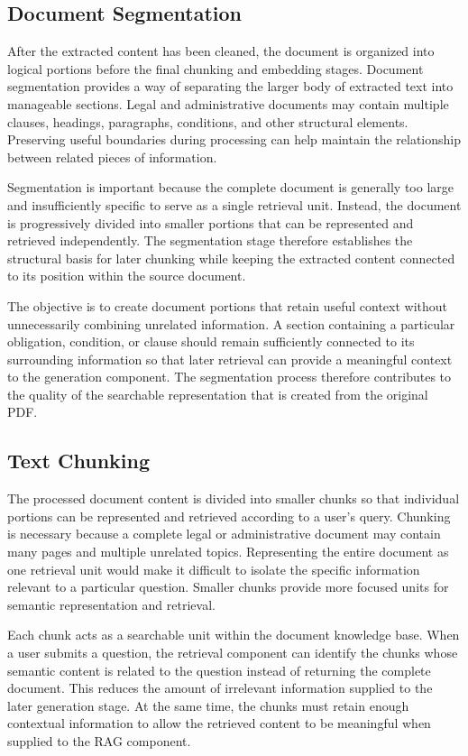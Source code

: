 \documentclass[12pt,a4paper,oneside]{report}
\begin{document}
\subsection{Document Segmentation}

After the extracted content has been cleaned, the document is organized into
logical portions before the final chunking and embedding stages. Document
segmentation provides a way of separating the larger body of extracted text
into manageable sections. Legal and administrative documents may contain
multiple clauses, headings, paragraphs, conditions, and other structural
elements. Preserving useful boundaries during processing can help maintain
the relationship between related pieces of information.

Segmentation is important because the complete document is generally too
large and insufficiently specific to serve as a single retrieval unit.
Instead, the document is progressively divided into smaller portions that
can be represented and retrieved independently. The segmentation stage
therefore establishes the structural basis for later chunking while keeping
the extracted content connected to its position within the source document.

The objective is to create document portions that retain useful context
without unnecessarily combining unrelated information. A section containing
a particular obligation, condition, or clause should remain sufficiently
connected to its surrounding information so that later retrieval can provide
a meaningful context to the generation component. The segmentation process
therefore contributes to the quality of the searchable representation that
is created from the original PDF.

\subsection{Text Chunking}

The processed document content is divided into smaller chunks so that
individual portions can be represented and retrieved according to a user's
query. Chunking is necessary because a complete legal or administrative
document may contain many pages and multiple unrelated topics. Representing
the entire document as one retrieval unit would make it difficult to isolate
the specific information relevant to a particular question. Smaller chunks
provide more focused units for semantic representation and retrieval.

Each chunk acts as a searchable unit within the document knowledge base.
When a user submits a question, the retrieval component can identify the
chunks whose semantic content is related to the question instead of
returning the complete document. This reduces the amount of irrelevant
information supplied to the later generation stage. At the same time, the
chunks must retain enough contextual information to allow the retrieved
content to be meaningful when supplied to the RAG component.
\end{document}
